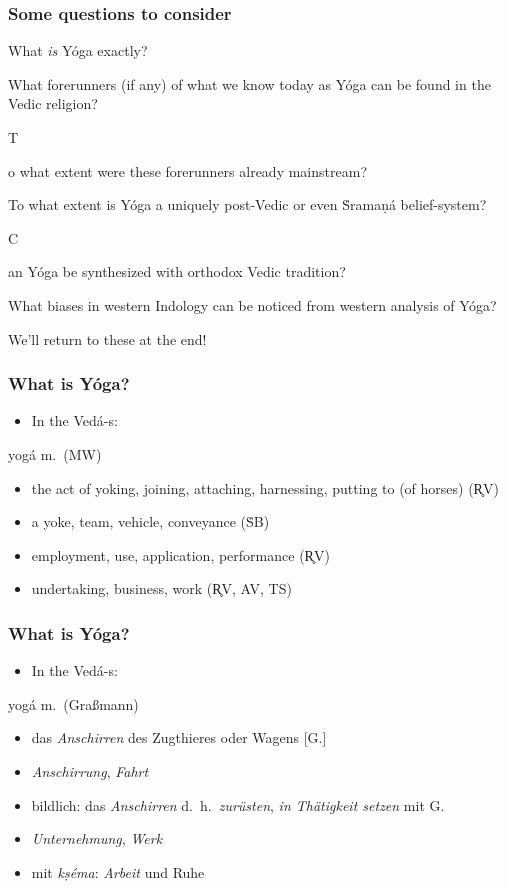 \documentclass[pdf]{beamer}
\newcommand{\Subitem}[1]{{\setlength\itemindent{12pt} \item[-] #1}}
\begin{document}
\begin{frame}[label=questions] \frametitle{Some questions to consider}
\begin{itemize}
	\item What \emph{is} Yóga exactly?
	\item What forerunners (if any) of what we know today as Yóga can be found in the Vedic religion?
	\Subitem To what extent were these forerunners already mainstream?
	\item To what extent is Yóga a uniquely post-Vedic or even Ṡramaṇá belief-system?
	\Subitem Can Yóga be synthesized with orthodox Vedic tradition?
	\item What biases in western Indology can be noticed from western analysis of Yóga?
	\item We'll return to these at the end!
\end{itemize}
\end{frame}

\begin{frame} \frametitle{What is Yóga?}
\begin{itemize}
	\item In the Vedá-s:
\end{itemize}
 
\begin{block} {yogá m.~(MW)}
\begin{itemize}
	\item the act of yoking, joining, attaching, harnessing, putting to (of horses) (R̥V)
	\item a yoke, team, vehicle, conveyance (ṠB)
	\item employment, use, application, performance (R̥V)
	\item undertaking, business, work (R̥V, AV, TS)
\end{itemize}
\end{block}
\end{frame}

\begin{frame} \frametitle{What is Yóga?}
\begin{itemize}
	\item In the Vedá-s:
\end{itemize}

\begin{block} {yogá m.~(Graßmann)}
\begin{itemize}
	\item das \emph{Anschirren} des Zugthieres oder Wagens [G.]
	\item \emph{Anschirrung}, \emph{Fahrt}
	\item bildlich: das \emph{Anschirren} d.~h.~\emph{zurüsten}, \emph{in Thätigkeit setzen} mit G.
	\item \emph{Unternehmung}, \emph{Werk}
	\item mit \textit{kṣéma}: \emph{Arbeit} und Ruhe
\end{itemize}
\end{block}
\end{frame}
\end{document}
